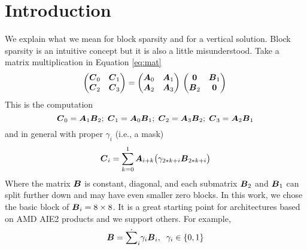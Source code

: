 \documentclass{IEEEtran}
\begin{document}




\section{Introduction}
\label{sec:introduction}

We explain what we mean for block sparsity and for a vertical
solution. Block sparsity is an intuitive concept but it is also a
little misunderstood. Take a matrix multiplication in Equation
\ref{eq:mat}
\begin{equation}
  \label{eq:mat}
  \begin{pmatrix}
    \Vc{C}_0 & \Vc{C}_1 \\
    \Vc{C}_2 & \Vc{C}_3 \\ 
  \end{pmatrix} = 
  \begin{pmatrix}
    \Vc{A}_0 & \Vc{A}_1 \\
    \Vc{A}_2 & \Vc{A}_3 \\ 
  \end{pmatrix}\\  \begin{pmatrix}
    \Vc{0}   & \Vc{B}_1 \\
    \Vc{B}_2 & \Vc{0} \\ 
  \end{pmatrix}\\
\end{equation}
This is the computation {\small \begin{equation} {\boldsymbol C}_0 = {\boldsymbol A}_{1}
    {\boldsymbol B}_{2}; \; {\boldsymbol C}_1 = {\boldsymbol A}_{0} {\boldsymbol B}_{1}; \; {\boldsymbol C}_2 =
    {\boldsymbol A}_{3} {\boldsymbol B}_{2}; \; {\boldsymbol C}_3 = {\boldsymbol A}_{2} {\boldsymbol B}_{1}
\end{equation}}
and in general with proper $\gamma_i$ (i.e., a mask)
\begin{equation}
  {\boldsymbol C}_i = \sum_{k=0}^1 {\boldsymbol A}_{i+ k} \big(\gamma_{2*k+i} {\boldsymbol B}_{2*k+i}\big)
\end{equation}
Where the matrix ${\boldsymbol B}$ is constant, diagonal, and each submatrix
${\boldsymbol B_2}$ and ${\boldsymbol B}_1$ can split further down and may have even
smaller zero blocks. In this work, we chose the basic block of
${\boldsymbol B}_i = 8\times 8$. It is a great starting point for architectures
based on AMD AIE2 products and we support others.  For example,
\begin{equation}
  {\boldsymbol B} = \dot{\sum}_i \gamma_i {\boldsymbol B}_i, \;\; \gamma_i \in \{0,1\} 
\end{equation}
\end{document}
